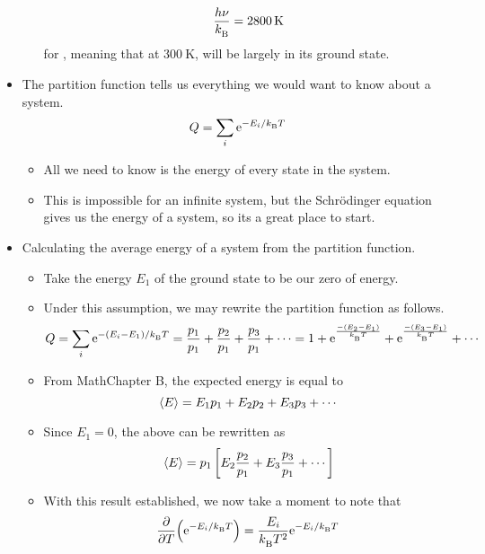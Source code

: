 \documentclass[../notes.tex]{subfiles}
\begin{document}
\begin{itemize}
\begin{itemize}
\begin{equation*}
            \frac{h\nu}{\kB} = \SI{2800}{\kelvin}
        \end{equation*}
        for , meaning that at $\SI{300}{\kelvin}$,  will be largely in its ground state.
    \end{itemize}
    \item The partition function tells us everything we would want to know about a system.
    \begin{equation*}
        Q = \sum_i\e[-E_i/\kB T]
    \end{equation*}
    \begin{itemize}
        \item All we need to know is the energy of every state in the system.
        \item This is impossible for an infinite system, but the Schr\"{o}dinger equation gives us the energy of a system, so its a great place to start.
    \end{itemize}
    \item Calculating the average energy of a system from the partition function.
    \begin{itemize}
        \item Take the energy $E_1$ of the ground state to be our zero of energy.
        \item Under this assumption, we may rewrite the partition function as follows.
        \begin{equation*}
            Q = \sum_i\e[-(E_i-E_1)/\kB T]
            = \frac{p_1}{p_1}+\frac{p_2}{p_1}+\frac{p_3}{p_1}+\cdots
            = 1+\e[\frac{-(E_2-E_1)}{\kB T}]+\e[\frac{-(E_3-E_1)}{\kB T}]+\cdots
        \end{equation*}
        \item From MathChapter B, the expected energy is equal to
        \begin{equation*}
            \prb{E} = E_1p_1+E_2p_2+E_3p_3+\cdots
        \end{equation*}
        \item Since $E_1=0$, the above can be rewritten as
        \begin{equation*}
            \prb{E} = p_1\left[ E_2\frac{p_2}{p_1}+E_3\frac{p_3}{p_1}+\cdots \right]
        \end{equation*}
        \item With this result established, we now take a moment to note that
        \begin{equation*}
            \pdv{T}(\e[-E_i/\kB T]) = \frac{E_i}{\kB T^2}\e[-E_i/\kB T]

\end{equation*}
\end{itemize}
\end{itemize}
\end{document}
